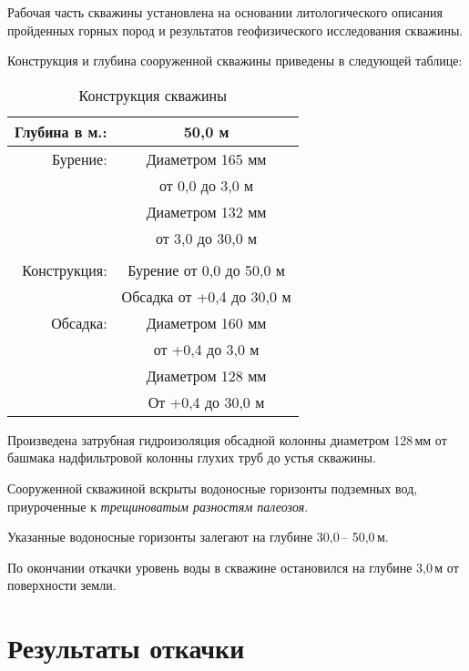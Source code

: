 \documentclass[a4paper,12pt]{article} %
\newcommand{\txtOgolovok}{+0,4}					%
\newcommand{\txtDepth}{50,0}					%
\newcommand{\txtLevel}{3,0}						%
\newcommand{\txtHorizDepth}{30,0}				%
\newcommand{\txtGeology}{трещиноватым разностям палеозоя}
\newcommand{\txtCondDiam}{160}					%
\newcommand{\txtCondBtm}{3,0}					%
\newcommand{\txtTubeDiam}{128}					%
\newcommand{\txtTubeBtm}{30,0}					%
\newcommand{\txtHoleDiam}{132}					%
\begin{document}
Рабочая часть скважины установлена на основании литологического описания пройденных горных пород и результатов геофизического исследования скважины.

\newpage

Конструкция и глубина сооруженной скважины приведены в следующей таблице:

\bigskip

\begin{table}[!h]
	\caption{Конструкция скважины}
	\centering
\begin{tabular}{rc}
	\hline 
	Глубина в м.: & {\txtDepth} м \\ 
	\hline 
	Бурение: & Диаметром 165 мм \\ 
	& от 0,0 до {\txtCondBtm} м \\ 
	& Диаметром {\txtHoleDiam} мм \\ 
	& от {\txtCondBtm} до {\txtTubeBtm} м \\ 
	&  \\ 
	\hline 
	Конструкция: & Бурение от 0,0 до {\txtDepth} м \\ 
	& Обсадка от {\txtOgolovok} до {\txtTubeBtm} м \\ 
	\hline 
	Обсадка: & Диаметром {\txtCondDiam} мм \\ 
	& от {\txtOgolovok} до {\txtCondBtm} м \\ 
	& Диаметром {\txtTubeDiam} мм  \\ 
	& От {\txtOgolovok} до {\txtTubeBtm} м \\ 
	\hline 
\end{tabular} 
\end{table}

Произведена затрубная гидроизоляция обсадной колонны диаметром \txtTubeDiam \,мм от башмака надфильтровой колонны глухих труб до устья скважины.

Сооруженной скважиной вскрыты водоносные горизонты  подземных вод, приуроченные к \emph{\txtGeology}.

Указанные водоносные горизонты залегают на глубине   \txtHorizDepth \,– \txtDepth \,м.

По окончании откачки уровень воды в скважине остановился на глубине  \txtLevel \,м от поверхности земли.

\section*{Результаты откачки}
\end{document}
